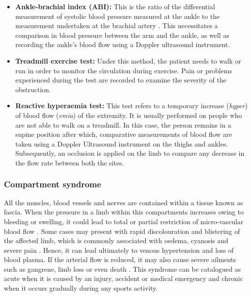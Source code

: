 \begin{itemize}
	\item \textbf{Ankle-brachial index (ABI):} This is the ratio of the differential measurement of systolic blood pressure measured at the ankle to the measurement undertaken at the brachial artery \cite{winsor1950influence}. This necessitates a comparison in blood pressure between the arm and the ankle, as well as recording the ankle's blood flow using a Doppler ultrasound instrument.  
	\item \textbf{Treadmill exercise test: }Under this method, the patient needs to walk or run in order to monitor the circulation during exercise. Pain or problems experienced during the test are recorded to examine the severity of the obstruction.
	\item \textbf{Reactive hyperaemia test:} This test refers to a temporary increase (\textit{hyper}) of blood flow (\textit{emia}) of the extremity. It is usually performed on people who are not able to walk on a treadmill. In this case, the person remains in a supine position after which, comparative measurements of blood flow are taken using a Doppler Ultrasound instrument on the thighs and ankles. Subsequently, an occlusion is applied on the limb to compare any decrease in the flow rate between both the sites. 
\end{itemize}

\subsubsection{Compartment syndrome}
\label{section literature 2.2}                                                                                                                                                                                                                                                                                                                                                                                                                                                                                                                                                                                                                     
All the muscles, blood vessels and nerves are contained within a tissue known as fascia. When the pressure in a limb within this compartments increases owing to bleeding or swelling, it could lead to total or partial restriction of micro-vascular blood flow \cite{songer2001tissue}. Some cases may present with rapid discolouration and blistering of the affected limb, which is commonly associated with oedema, cyanosis and severe pain \cite{chhabra2013compartment}. Hence, it can lead ultimately to venous hypertension and loss of blood plasma. If the arterial flow is reduced, it may also cause severe ailments such as gangrene, limb loss or even death \cite{lamborn2014compartment}. This syndrome can be catalogued as acute when it is caused by an injury, accident or medical emergency and chronic when it occurs gradually during any sports activity.

